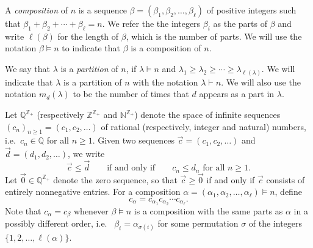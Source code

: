 \documentclass[11pt]{amsart}
\newcommand{\defncolor}{\color{darkred}}
\newcommand{\defn}[1]{{\defncolor\emph{#1}}} %
\theoremstyle{definition}
\numberwithin{equation}{section}
\def\NN{{\mathbb N}}
\def\ZZ{{\mathbb Z}}
\def\QQ{{\mathbb Q}}
\begin{document}
A \defn{composition} of $n$ is a sequence $\beta = (\beta_1, \beta_2, \ldots, \beta_\ell)$ of positive integers such that $\beta_{1} + \beta_{2} + \cdots + \beta_{\ell} = n$.  
We refer the the integers $\beta_{i}$ as the parts of $\beta$ and write $\ell(\beta)$ for the length of $\beta$, which is the number of parts.  
We will use the notation $\beta \vDash n$ to indicate that $\beta$ is a composition of $n$.

We say that $\lambda$ is a \defn{partition} of $n$, if $\lambda \vDash n$ and
$\lambda_1 \geq \lambda_2 \geq \cdots \geq \lambda_{\ell(\lambda)}$.  We will indicate that $\lambda$ is a partition
of $n$ with the notation $\lambda \vdash n$.  We will also use the notation $m_d(\lambda)$ to be the number of times
that $d$ appears as a part in $\lambda$.

Let $\QQ^{\ZZ_+}$ (respectively $\ZZ^{\ZZ_+}$ and $\NN^{\ZZ_+}$) denote the space of infinite sequences
$(c_{n})_{n \ge 1} = (c_{1}, c_{2}, \ldots)$ of rational (respectively, integer and natural) numbers,
i.e.~$c_{n} \in \QQ$ for all $n \ge 1$.
Given two sequences $\vec{c} = (c_{1}, c_{2}, \ldots)$ and $\vec{d} = (d_{1}, d_{2}, \ldots)$, we write
\[
\vec{c} \le \vec{d} 
\qquad\text{if and only if}\qquad
\text{$c_{n} \le d_{n}$ for all $n \ge 1$}.
\]
Let $\vec{0} \in \QQ^{\ZZ_+}$ denote the zero sequence, so that $\vec{c} \ge \vec{0}$
if and only if $\vec{c}$ consists of entirely nonnegative entries.
For a composition $\alpha = (\alpha_{1}, \alpha_{2}, \ldots, \alpha_{\ell}) \vDash n$, define
\[
c_{\alpha} = c_{\alpha_{1}} c_{\alpha_{2}} \cdots c_{\alpha_{\ell}}.
\]
Note that $c_{\alpha} = c_{\beta}$ whenever $\beta \vDash n$ is a composition with the same parts as $\alpha$ in a possibly different order, i.e.~ $\beta_{i} = \alpha_{\sigma(i)}$ for some permutation $\sigma$ of the integers $\{1,2, \ldots, \ell(\alpha)\}$.


%
\end{document}

